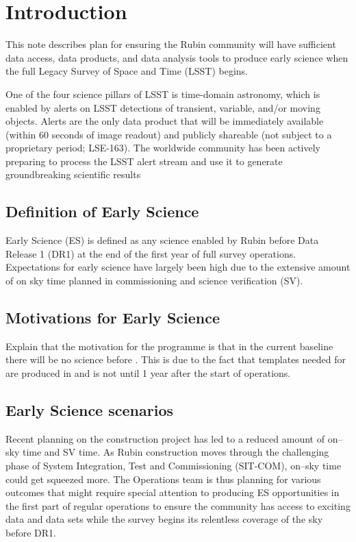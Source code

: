 \section{Introduction}

This  note describes plan for ensuring the Rubin community will have sufficient data access, data products, and data analysis tools to produce early science when the full Legacy Survey of Space and Time (LSST)  begins. 

One of the four science pillars of LSST is time-domain astronomy, which is enabled by alerts
on LSST detections of transient, variable, and/or moving objects. 
Alerts are the only data product that will be immediately available (within 60 seconds of image readout) and publicly
shareable (not subject to a proprietary period; LSE-163). 
The worldwide community has been actively preparing to process the LSST alert stream and use it to generate groundbreaking scientific results 

\subsection{Definition of Early Science}  \label{ssec:defn}
Early Science (ES) is defined as any science enabled by Rubin  before Data Release 1 (DR1) at the end of the first year of full survey operations. 
Expectations for early science have largely been high due to the extensive amount of on sky time planned in commissioning and science verification (SV).  

\subsection{Motivations for Early Science}
Explain that the motivation for the \es programme is that in the current baseline there will be no science before \drone. 
This is due to the fact that templates needed for \diffim are produced in \drp and \drone is not until 1 year after the start of operations. 

\subsection{Early Science scenarios } \label{ssec:scenarios}
Recent planning on the construction project has led to a reduced amount of on--sky time and SV time.
As Rubin construction moves through the challenging phase of System Integration, Test and Commissioning (SIT-COM), on--sky time could get squeezed more. The Operations team is thus planning for various outcomes that might require special attention to producing ES opportunities in the first part of regular operations to ensure the community has access to exciting data and data sets while the survey begins its relentless coverage of the sky before DR1.

